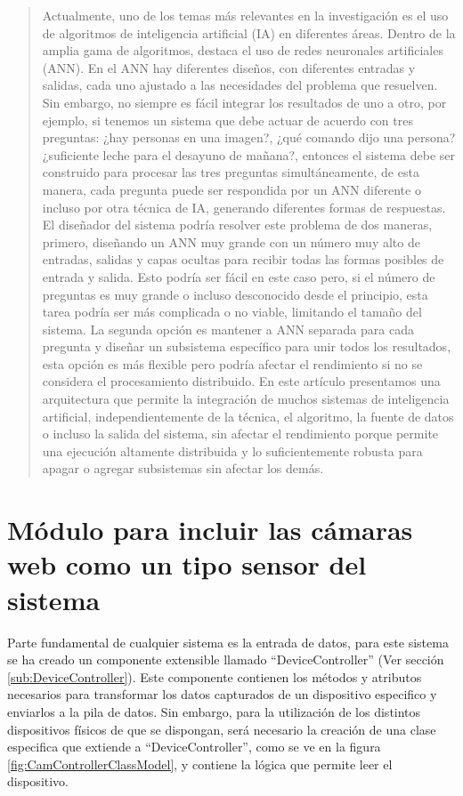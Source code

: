 \begin{quote}
Actualmente, uno de los temas más relevantes en la investigación es el uso de algoritmos de inteligencia artificial (IA) en diferentes áreas. Dentro de la amplia gama de algoritmos, destaca el uso de redes neuronales artificiales (ANN). En el ANN hay diferentes diseños, con diferentes entradas y salidas, cada uno ajustado a las necesidades del problema que resuelven. Sin embargo, no siempre es fácil integrar los resultados de uno a otro, por ejemplo, si tenemos un sistema que debe actuar de acuerdo con tres preguntas: ¿hay personas en una imagen?, ¿qué comando dijo una persona? ¿suficiente leche para el desayuno de mañana?, entonces el sistema debe ser construido para procesar las tres preguntas simultáneamente, de esta manera, cada pregunta puede ser respondida por un ANN diferente o incluso por otra técnica de IA, generando diferentes formas de respuestas. El diseñador del sistema podría resolver este problema de dos maneras, primero, diseñando un ANN muy grande con un número muy alto de entradas, salidas y capas ocultas para recibir todas las formas posibles de entrada y salida. Esto podría ser fácil en este caso pero, si el número de preguntas es muy grande o incluso desconocido desde el principio, esta tarea podría ser más complicada o no viable, limitando el tamaño del sistema. La segunda opción es mantener a ANN separada para cada pregunta y diseñar un subsistema específico para unir todos los resultados, esta opción es más flexible pero podría afectar el rendimiento si no se considera el procesamiento distribuido. En este artículo presentamos una arquitectura que permite la integración de muchos sistemas de inteligencia artificial, independientemente de la técnica, el algoritmo, la fuente de datos o incluso la salida del sistema, sin afectar el rendimiento porque permite una ejecución altamente distribuida y lo suficientemente robusta para apagar o agregar subsistemas sin afectar los demás.
\end{quote}
\newpage

\section{Módulo para incluir las cámaras web como un tipo sensor del sistema}
    Parte fundamental de cualquier sistema es la entrada de datos, para este sistema se ha creado un componente extensible llamado ``DeviceController'' (Ver sección \ref{sub:DeviceController}). Este componente contienen los métodos y atributos necesarios para transformar los datos capturados de un dispositivo especifico y enviarlos a la pila de datos. Sin embargo, para la utilización de los distintos dispositivos físicos de que se dispongan, será necesario la creación de una clase especifica que extiende a ``DeviceController'', como se ve en la figura \ref{fig:CamControllerClassModel}, y contiene la lógica que permite leer el dispositivo.
    
